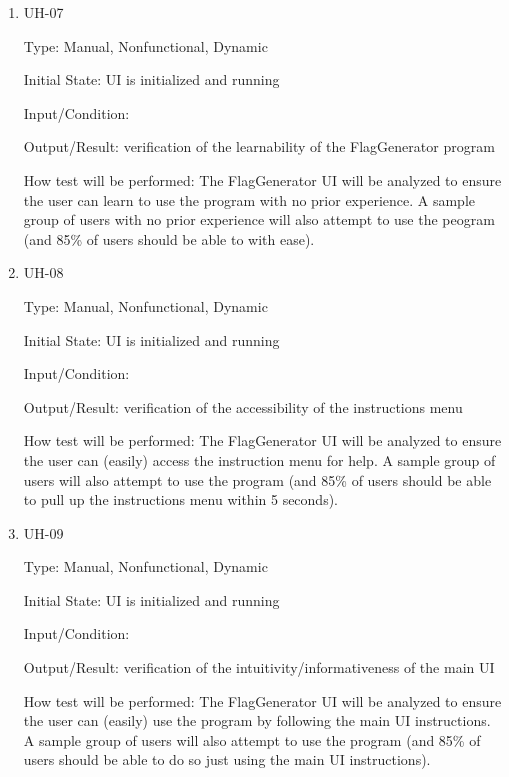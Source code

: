 \documentclass[12pt, titlepage]{article}
\begin{document}
\begin{enumerate}

\item{UH-07\\}

Type: Manual, Nonfunctional, Dynamic

Initial State: UI is initialized and running

Input/Condition: 

Output/Result: verification of the learnability of the FlagGenerator program

How test will be performed: The FlagGenerator UI will be analyzed to ensure
the user can learn to use the program with no prior experience. A sample group
of users with no prior experience will also attempt to use the peogram (and
85\% of users should be able to with ease).

\item{UH-08\\}

Type: Manual, Nonfunctional, Dynamic

Initial State: UI is initialized and running

Input/Condition: 

Output/Result: verification of the accessibility of the instructions menu

How test will be performed: The FlagGenerator UI will be analyzed to ensure
the user can (easily) access the instruction menu for help. A sample group of
users will also attempt to use the program (and 85\% of users should be able
to pull up the instructions menu within 5 seconds).

\item{UH-09\\}

Type: Manual, Nonfunctional, Dynamic

Initial State: UI is initialized and running

Input/Condition: 

Output/Result: verification of the intuitivity/informativeness of the main UI

How test will be performed: The FlagGenerator UI will be analyzed to ensure
the user can (easily) use the program by following the main UI instructions.
A sample group of users will also attempt to use the program (and 85\% of
users should be able to do so just using the main UI instructions).

\end{enumerate}
\end{document}

